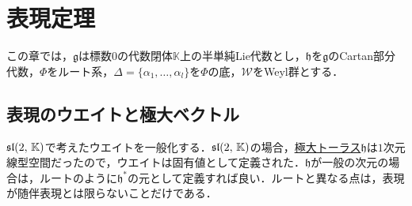 \documentclass[rep_main]{subfiles}
\begin{document}
\setcounter{chapter}{5}

\chapter{表現定理}
この章では，$\mathfrak{g}$は標数$0$の代数閉体$\mathbb{K}$上の半単純Lie代数とし，$\mathfrak{h}$を$\mathfrak{g}$のCartan部分代数，$\Phi$をルート系，$\Delta = \{\alpha_1, \ldots, \alpha_l\}$を$\Phi$の底，$\mathscr{W}$をWeyl群とする．

\section{表現のウエイトと極大ベクトル}
$\mathfrak{sl}(2,\, \mathbb{K})$で考えたウエイトを一般化する．$\mathfrak{sl}(2,\, \mathbb{K})$の場合，\hyperref[def:toral-subLieAlg]{極大トーラス}$\mathfrak{h}$は$1$次元線型空間だったので，ウエイトは固有値として定義された．$\mathfrak{h}$が一般の次元の場合は，ルートのように$\mathfrak{h}^*$の元として定義すれば良い．ルートと異なる点は，表現が随伴表現とは限らないことだけである．
\end{document}

